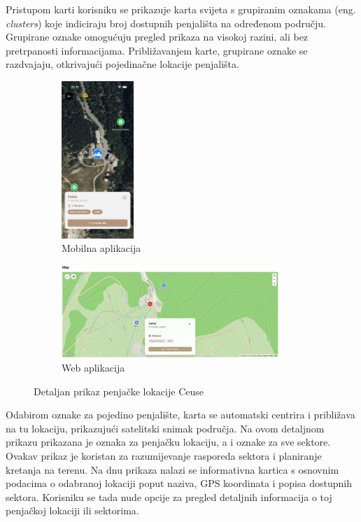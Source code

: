 Pristupom karti korisniku se prikazuje karta svijeta s grupiranim oznakama (eng. \textit{clusters}) koje indiciraju broj dostupnih penjališta na određenom području. Grupirane oznake omogućuju pregled prikaza na visokoj razini, ali bez pretrpanosti informacijama. Približavanjem karte, grupirane oznake se razdvajaju, otkrivajući pojedinačne lokacije penjališta.

\begin{figure}[H]
    \centering
    \begin{subfigure}[b]{\textwidth}
        \centering
        \includegraphics[width=0.3\textwidth]{images/implementacija/geo_karta_ceuse.png}
        \caption{Mobilna aplikacija}
        \label{fig:geografska_karta_ceuse_mob}
    \end{subfigure}
    \hfill
    \begin{subfigure}[b]{\textwidth}
        \centering
        \includegraphics[width=0.9\textwidth]{images/implementacija/web/map_selected.png}
        \caption{Web aplikacija}
        \label{fig:geografska_karta_ceuse_web}
    \end{subfigure}
    \caption{Detaljan prikaz penjačke lokacije Ceuse}
    \label{fig:geografska_karta_ceuse_sidebyside}
\end{figure}

Odabirom oznake za pojedino penjalište, karta se automatski centrira i približava na tu lokaciju, prikazujući satelitski snimak područja. Na ovom detaljnom prikazu prikazana je oznaka za penjačku lokaciju, a i oznake za sve sektore. Ovakav prikaz je koristan za razumijevanje rasporeda sektora i planiranje kretanja na terenu. Na dnu prikaza nalazi se informativna kartica s osnovnim podacima o odabranoj lokaciji poput naziva, GPS koordinata i popisa dostupnih sektora. Korisniku se tada nude opcije za pregled detaljnih informacija o toj penjačkoj lokaciji ili sektorima. 
